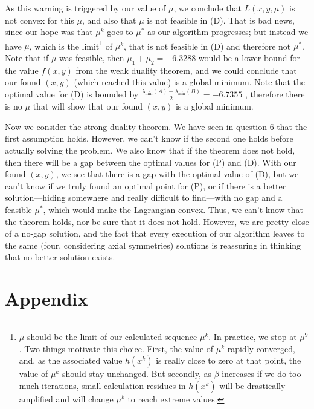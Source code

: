\documentclass{article}
\begin{document}
As this warning is triggered by our value of $\mu$, we conclude that $L(x, y, \mu)$ is not convex for this $\mu$, and also that $\mu$ is not feasible in (D). That is bad news, since our hope was that $\mu^k$ goes to $\mu^*$ as our algorithm progresses; but instead we have $\mu$, which is the limit\footnote{$\mu$ should be the limit of our calculated sequence $\mu^k$. In practice, we stop at $\mu^9$. Two things motivate this choice. First, the value of $\mu^k$ rapidly converged, and, as the associated value $h(x^k)$ is really close to zero at that point, the value of $\mu^k$ should stay unchanged. But secondly, as $\beta$ increases if we do too much iterations, small calculation residues in $h(x^k)$ will be drastically amplified and will change $\mu^k$ to reach extreme values.}
of $\mu^k$, that is not feasible in (D) and therefore not $\mu^*$. Note that if $\mu$ was feasible, then $\mu_1 + \mu_2 = -6.3288$ would be a lower bound for the value $f(x, y)$ from the weak duality theorem, and we could conclude that our found $(x, y)$ (which reached this value) is a global minimum.
Note that the optimal value for (D) is bounded by $\frac{\lambda_{\min}(A) + \lambda_{\min}(B)}{2} = -6.7355$ , therefore there is no $\mu$ that will show that our found $(x, y)$ is a global minimum.

Now we consider the strong duality theorem. We have seen in question 6 that the first assumption holds. However, we can't know if the second one holds before actually solving the problem. We also know that if the theorem does not hold, then there will be a gap between the optimal values for (P) and (D). With our found $(x, y)$, we see that there is a gap with the optimal value of (D), but we can't know if we truly found an optimal point for (P), or if there is a better solution---hiding somewhere and really difficult to find---with no gap and a feasible $\mu^*$, which would make the Lagrangian convex. Thus, we can't know that the theorem holds, nor be sure that it does not hold. However, we are pretty close of a no-gap solution, and the fact that every execution of our algorithm leaves to the same (four, considering axial symmetries) solutions is reassuring in thinking that no better solution exists.\\

\pagebreak

\section*{Appendix}
\end{document}
